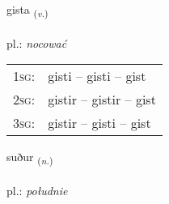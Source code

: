 \documentclass[frontgrid, backgrid]{flacards}\usepackage[]{graphicx}\usepackage[]{xcolor}
\begin{document}
\renewcommand{\flhead}{\vskip5pt \fboxsep=0pt {\small\bfseries\footnotesize Sagnorð | czasownik}}
\renewcommand{\fcfoot}{\vskip5pt \fboxsep=0pt \hspace{2pt}{\small\bfseries\footnotesize 3K}}

\renewcommand{\blhead}{\vskip5pt {\small\bfseries\footnotesize Sagnorð | czasownik }}
\renewcommand{\bcfoot}{\vskip5pt \hspace{2pt}{\small\bfseries\footnotesize 3K}}


{gista \small{\textsubscript{(\textit{v.})}} \\[1ex] %
\textphonetic{[cɪsta]} \\
pl.: \emph{nocować} \\  [2ex]
\renewcommand*{\arraystretch}{0.8}
\begin{tabular}{p{1cm}l}
\textsc{1sg}: & gisti -- gisti -- gist \\ 
\textsc{2sg}: & gistir -- gistir -- gist \\ 
\textsc{3sg}: & gistir -- gisti -- gist \\ 
\end{tabular}
}

\renewcommand{\flhead}{\vskip5pt \fboxsep=0pt {\small\bfseries\footnotesize Nafnorð | rzeczownik}}
\renewcommand{\fcfoot}{\vskip5pt \fboxsep=0pt \hspace{2pt}{\small\bfseries\footnotesize 3K}}

\renewcommand{\blhead}{\vskip5pt {\small\bfseries\footnotesize Nafnorð | rzeczownik }}
\renewcommand{\bcfoot}{\vskip5pt \hspace{2pt}{\small\bfseries\footnotesize 3K}}


{suður \small{\textsubscript{(\textit{n.})}} \\[1ex] %
\textphonetic{[sʏːðʏr]} \\
pl.: \emph{południe} \\  [2ex]
\renewcommand*{\arraystretch}{0.8}
}
\end{document}
